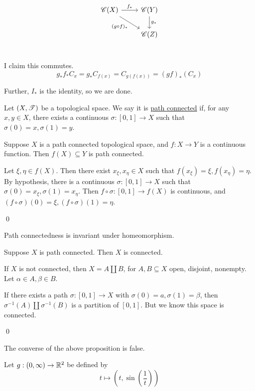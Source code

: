 \documentclass[x11names,reqno,14pt]{extarticle}
\newcommand*{\oo}{{\infty}}
\begin{document}
\[
\begin{tikzcd}
\ms{C}(X) \ar[r, "f_*"] \ar[rd, "(g \circ f)_*"' ] & \ms{C}(Y) \ar[d, "g_*"] \\ & \ms{C}(Z) \\
\end{tikzcd} 
\]

I claim this commutes. 
\[
g_*f_*C_x = g_*C_{f(x)} = C_{g(f(x))} = (gf)_*(C_x)
\]

Further, $I_*$ is the identity, so we are done. 


Let $(X, \mathscr{T})$ be a topological space. We say it is \underline{path connected} if, for any $x, y \in X$, there exists a continuous $\sigma:[0, 1]\to X$ such that $\sigma(0) = x, \sigma(1) = y$. 

\lem

Suppose $X$ is a path connected topological space, and $f:X\to Y$ is a continuous function. Then $f(X) \subseteq Y$ is path connected.

\proof

Let $\xi, \eta \in f(X)$. Then there exist $x_\xi, x_\eta \in X$ such that $f(x_\xi) = \xi, f(x_\eta) = \eta$. By hypothesis, there is a continuous $\sigma:[0, 1]\to X$ such that $\sigma(0) = x_\xi, \sigma(1) = x_\eta$. Then $f\circ \sigma:[0, 1]\to f(X)$ is continuous, and $(f\circ \sigma)(0) = \xi, (f\circ \sigma)(1) = \eta$. 

\qed

\cor

Path connectedness is invariant under homeomorphism. 

\prop

Suppose $X$ is path connected. Then $X$ is connected. 

\proof

If $X$ is not connected, then $X = A\coprod B$, for $A, B \subseteq X$ open, disjoint, nonempty. Let $\alpha \in A, \beta \in B$. 

If there exists a path $\sigma:[0, 1]\to X$ with $\sigma(0) = a, \sigma(1) = \beta$, then $\sigma^{-1}(A) \coprod \sigma^{-1}(B)$ is a partition of $[0, 1]$. But we know this space is connected. 

\qed

The converse of the above proposition is false. 

Let $g:(0, \oo)\to\R^2$ be defined by 
\[
t\mapsto (t, \sin(\frac{1}{t}))
\]
\end{document}
